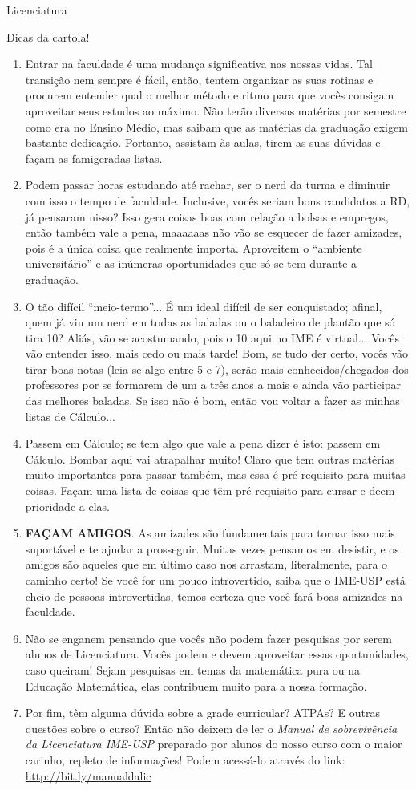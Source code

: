 \begin{subsecao}{Licenciatura}
\begin{subsubsecao}{Dicas da cartola!}
\begin{enumerate}
\item Entrar na faculdade é uma mudança significativa nas nossas vidas. Tal transição
nem sempre é fácil, então, tentem organizar as suas rotinas e procurem entender qual
o melhor método e ritmo para que vocês consigam aproveitar seus estudos ao máximo. Não
terão diversas matérias por semestre como era no Ensino Médio, mas saibam que as matérias
da graduação exigem bastante dedicação. Portanto, assistam às aulas, tirem as suas dúvidas
e façam as famigeradas listas.
\item Podem passar horas estudando até rachar, ser o nerd da turma e diminuir com
 isso o tempo de faculdade. Inclusive, vocês seriam bons candidatos a RD, já pensaram nisso? 
Isso gera coisas boas com relação a bolsas e empregos, então também vale a pena, 
maaaaaas não vão se esquecer de fazer amizades, pois é a única coisa que realmente importa.
Aproveitem o ``ambiente universitário'' e as inúmeras oportunidades que só se tem durante
a graduação.
\item O tão difícil ``meio-termo''... É um ideal difícil de ser conquistado; afinal,
  quem já viu um nerd em todas as baladas ou o baladeiro de plantão que só tira
  10? Aliás, vão se acostumando, pois o 10 aqui no IME é virtual... Vocês vão
  entender isso, mais cedo ou mais tarde! Bom, se tudo der certo, vocês vão
  tirar boas notas (leia-se algo entre 5 e 7), serão mais conhecidos/chegados
  dos professores por se formarem de um a três anos a mais e ainda
  vão participar das melhores baladas. %
  Se isso não é bom, então vou voltar a fazer as minhas listas de Cálculo...
\item Passem em Cálculo; se tem algo que vale a pena dizer é isto: passem em
  Cálculo. Bombar aqui vai atrapalhar muito! Claro que tem outras matérias muito
  importantes para passar também, mas essa é pré-requisito para muitas coisas.
  Façam uma lista de coisas que têm pré-requisito para cursar e deem prioridade
  a elas. 
  \item \textbf{FAÇAM AMIGOS}. As amizades são fundamentais para tornar isso
mais suportável e te ajudar a prosseguir. Muitas vezes pensamos em desistir,
 e os amigos são aqueles que em último caso nos arrastam, literalmente, para o caminho certo!
 Se você for um pouco introvertido, saiba que o IME-USP está cheio de pessoas introvertidas, 
 temos certeza que você fará boas amizades na faculdade.
 \item Não se enganem pensando que vocês não podem fazer pesquisas por serem alunos de
 Licenciatura. Vocês podem e devem aproveitar essas oportunidades, caso queiram! Sejam pesquisas
 em temas da matemática pura ou na Educação Matemática, elas contribuem muito para a nossa formação.
 \item Por fim, têm alguma dúvida sobre a grade curricular? ATPAs? E outras questões sobre o curso?
Então não deixem de ler o \textit{Manual de sobrevivência da Licenciatura IME-USP} preparado por alunos
do nosso curso com o maior carinho, repleto de informações! Podem acessá-lo através
do link: \url{http://bit.ly/manualdalic}


\end{enumerate}
\end{subsubsecao}
\end{subsecao}
